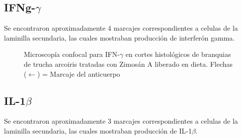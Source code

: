 \documentclass[12pt,letterpaper,oneside]{scrbook}
\begin{document}
\subsection{IFNg-$\gamma$}

Se encontraron aproximadamente 4 marcajes correspondientes a celulas de
la laminilla secundaria, las cuales mostraban producción de interferón
gamma.

\begin{figure}[h!]
    \centering
    \caption[Microscopía Confocal para IFN-$\gamma$]{Microscopía confocal para IFN-$\gamma$ en cortes histológicos de branquias de trucha arcoiris tratadas con Zimosán A liberado en dieta. Flechas ($\leftarrow$) = Marcaje del anticuerpo}
    \label {fig:gills:ifng}
\end{figure}

\subsection{IL-1$\beta$}

Se encontraron aproximadamente 3 marcajes correspondientes a celulas de
la laminilla secundaria, las cuales mostraban producción de
IL-1\(\beta\).
\end{document}
